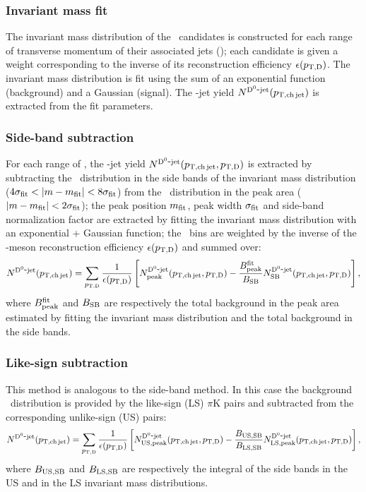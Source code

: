 \documentclass[a4paper]{jpconf}
\begin{document}
\subsubsection*{Invariant mass fit}
The invariant mass distribution of the \Dzero\ candidates is constructed for each range of transverse momentum of their associated jets (\ptchjet);
each candidate is given a weight corresponding to the inverse of its reconstruction efficiency $\epsilon(p_{\mathrm{T,D}})$.
The invariant mass distribution is fit using the sum of an exponential function (background) and a Gaussian (signal). 
The \Dzero-jet yield $N^{\rm \mathrm{D^{0}}\hbox{-}jet}(p_{\mathrm{T,ch\, jet}})$ is extracted from
the fit parameters.

\subsubsection*{Side-band subtraction}
For each range of \ptd, the \Dzero-jet yield $N^{\rm \mathrm{D^{0}}\hbox{-}jet}(p_{\mathrm{T,ch\, jet}},p_{\mathrm{T,D}})$ is extracted by subtracting the
\ptchjet\ distribution in the side bands of the invariant mass distribution ($4\sigma_{\rm fit} < \lvert m - m_{\rm fit} \rvert < 8\sigma_{\rm fit}$) 
from the \ptchjet\ distribution in the peak area ($\lvert m - m_{\rm fit} \rvert < 2\sigma_{\rm fit}$); the peak position $m_{\rm fit}$, peak width $\sigma_{\rm fit}$ and side-band normalization factor are extracted 
by fitting the invariant mass distribution with an exponential + Gaussian function; the \ptd\ bins are weighted by the inverse of the \Dzero-meson reconstruction efficiency $\epsilon(p_{\mathrm{T,D}})$ and summed over:
\begin{equation*}
N^{\rm \mathrm{D^{0}}\hbox{-}jet}(p_{\mathrm{T,ch\, jet}})=\sum_{p_{\mathrm{T,D}}} \frac{1}{\epsilon(p_{\mathrm{T,D}})} 
\left[N_{\rm peak}^{\rm \mathrm{D^{0}}\hbox{-}jet}(p_{\mathrm{T,ch\, jet}},p_{\mathrm{T,D}}) - 
\frac{B_{\rm peak}^{\rm fit}}{B_{\rm SB}} 
N_{\rm SB}^{\rm \mathrm{D^{0}}\hbox{-}jet}(p_{\mathrm{T,ch\, jet}},p_{\mathrm{T,D}})\right],
\end{equation*}
where $B_{\rm peak}^{\rm fit}$ and $B_{\rm SB}$ are respectively the total background
in the peak area estimated by fitting the invariant mass distribution and the total
background in the side bands.

\subsubsection*{Like-sign subtraction}
This method is analogous to the side-band method. In this case the background \ptchjet\ distribution is provided by the like-sign (LS) $\pi$K pairs and
subtracted from the corresponding unlike-sign (US) pairs:
\begin{equation*}
N^{\rm \mathrm{D^{0}}\hbox{-}jet}(p_{\mathrm{T,ch\, jet}})=\sum_{p_{\mathrm{T,D}}} \frac{1}{\epsilon(p_{\mathrm{T,D}})} 
\left[N_{\rm US, peak}^{\rm \mathrm{D^{0}}\hbox{-}jet}(p_{\mathrm{T,ch\, jet}},p_{\mathrm{T,D}}) - 
\frac{B_{\rm US, SB}}{B_{\rm LS, SB}} 
N_{\rm LS, peak}^{\rm \mathrm{D^{0}}\hbox{-}jet}(p_{\mathrm{T,ch\, jet}},p_{\mathrm{T,D}})\right],
\end{equation*}
where $B_{\rm US, SB}$ and $B_{\rm LS, SB}$ are respectively the integral of
the side bands in the US and in the LS invariant mass distributions.
\end{document}
